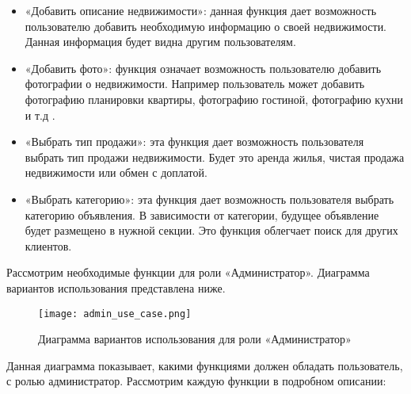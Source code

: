 \begin{itemize}
	\item «Добавить описание недвижимости»: данная функция дает возможность пользователю добавить необходимую информацию о своей недвижимости. Данная информация будет видна другим пользователям.  
	\item «Добавить фото»: функция означает возможность пользователю добавить фотографии о недвижимости. Например пользователь может добавить фотографию планировки квартиры, фотографию гостиной, фотографию кухни и т.д .
	\item «Выбрать тип продажи»: эта функция дает возможность пользователя выбрать тип продажи недвижимости. Будет это аренда жилья, чистая продажа недвижимости или обмен с доплатой.
	\item «Выбрать категорию»: эта функция дает возможность пользователя выбрать категорию объявления. В зависимости от категории, будущее объявление будет размещено в нужной секции. Это функция облегчает поиск для других клиентов.
\end{itemize}

Рассмотрим необходимые функции для роли «Администратор». Диаграмма вариантов использования представлена ниже.

\begin{figure}[!htb]
	\centering
	\texttt{[image: admin\_use\_case.png]}
	\caption{ Диаграмма вариантов использования для роли «Администратор»}
	\label{fig:arch_and_mod::lexer_flow}
	\clearpage
\end{figure}

Данная диаграмма показывает, какими функциями должен обладать пользователь, с ролью администратор.  Рассмотрим каждую функции в подробном описании:

